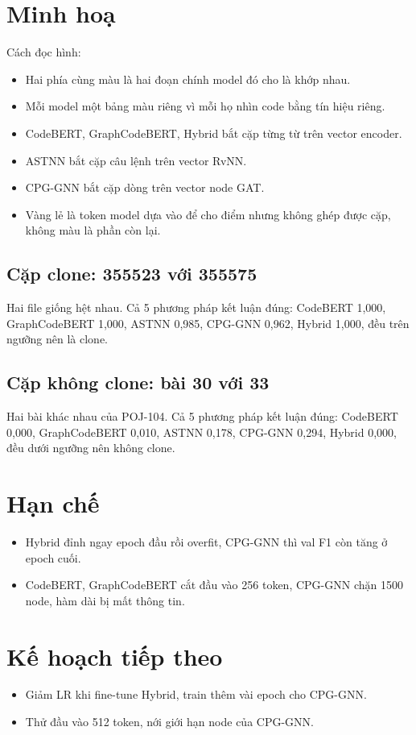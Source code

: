 \documentclass[11pt,a4paper]{article}
\begin{document}
\setcounter{section}{5}
\section{Minh hoạ}
Cách đọc hình:
\begin{itemize}[leftmargin=*,itemsep=0pt,topsep=2pt,parsep=0pt]
\item Hai phía cùng màu là hai đoạn chính model đó cho là khớp nhau.
\item Mỗi model một bảng màu riêng vì mỗi họ nhìn code bằng tín hiệu riêng.
\item CodeBERT, GraphCodeBERT, Hybrid bắt cặp từng từ trên vector encoder.
\item ASTNN bắt cặp câu lệnh trên vector RvNN.
\item CPG-GNN bắt cặp dòng trên vector node GAT.
\item \colorbox{evyellow!30}{Vàng} lẻ là token model dựa vào để cho điểm
  nhưng không ghép được cặp, không màu là phần còn lại.
\end{itemize}

\subsection{Cặp clone: 355523 với 355575}
Hai file giống hệt nhau.
Cả 5 phương pháp kết luận đúng: CodeBERT 1,000, GraphCodeBERT 1,000,
ASTNN 0,985, CPG-GNN 0,962, Hybrid 1,000, đều trên ngưỡng nên là clone.


\subsection{Cặp không clone: bài 30 với 33}
Hai bài khác nhau của POJ-104.
Cả 5 phương pháp kết luận đúng: CodeBERT 0,000, GraphCodeBERT 0,010,
ASTNN 0,178, CPG-GNN 0,294, Hybrid 0,000, đều dưới ngưỡng nên không clone.


\section{Hạn chế}
\begin{itemize}[leftmargin=*,itemsep=0pt,topsep=2pt,parsep=0pt]
\item Hybrid đỉnh ngay epoch đầu rồi overfit, CPG-GNN thì val F1 còn tăng
  ở epoch cuối.
\item CodeBERT, GraphCodeBERT cắt đầu vào 256 token,
  CPG-GNN chặn 1500 node, hàm dài bị mất thông tin.
\end{itemize}

\section{Kế hoạch tiếp theo}
\begin{itemize}[leftmargin=*,itemsep=0pt,topsep=2pt,parsep=0pt]
\item Giảm LR khi fine-tune Hybrid, train thêm vài epoch cho CPG-GNN.
\item Thử đầu vào 512 token, nới giới hạn node của CPG-GNN.
\end{itemize}
\end{document}
